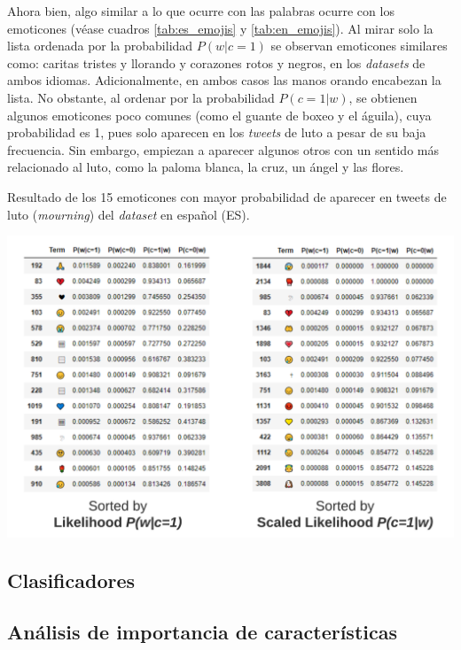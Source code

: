 Ahora bien, algo similar a lo que ocurre con las palabras ocurre con los emoticones (véase cuadros \ref{tab:es_emojis} y \ref{tab:en_emojis}). Al mirar solo la lista ordenada por la probabilidad $P(w|c=1)$ se observan emoticones similares como: caritas tristes y llorando y corazones rotos y negros, en los \textit{datasets} de ambos idiomas. Adicionalmente, en ambos casos las manos orando encabezan la lista. No obstante, al ordenar por la probabilidad $P(c=1|w)$, se obtienen algunos emoticones poco comunes (como el guante de boxeo y el águila), cuya probabilidad es 1, pues solo aparecen en los \textit{tweets} de luto a pesar de su baja frecuencia. Sin embargo, empiezan a aparecer algunos otros con un sentido más relacionado al luto, como la paloma blanca, la cruz, un ángel y las flores. 

\begin{table}[H]
    \centering
    \caption{Resultado de los 15 emoticones con mayor probabilidad de aparecer en tweets de luto (\textit{mourning}) del \textit{dataset} en español (ES).}
    \label{tab:en_emojis}
    \includegraphics[width=\textwidth]{doc/images/EN_Emojis.png}
\end{table}

\subsection{Clasificadores}


\subsection{Análisis de importancia de características}